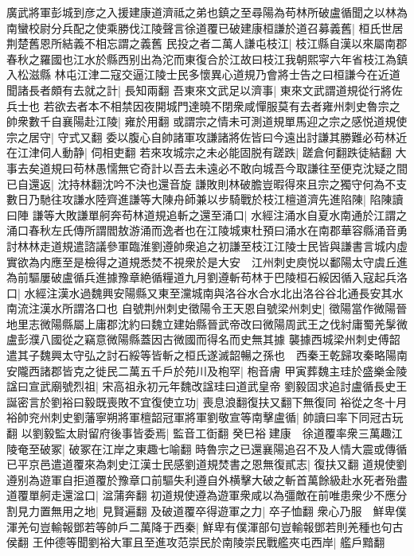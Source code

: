廣武將軍彭城到彦之入援建康道濟祗之弟也鎮之至尋陽為苟林所破盧循聞之以林為南蠻校尉分兵配之使乘勝伐江陵聲言徐道覆已破建康桓謙於道召募義舊|{
	桓氏世居荆楚舊恩所結義不相忘謂之義舊}
民投之者二萬人謙屯枝江|{
	枝江縣自漢以來屬南郡春秋之羅國也江水於縣西别出為沱而東復合於江故曰枝江我朝熙寜六年省枝江為鎮入松滋縣}
林屯江津二寇交逼江陵士民多懷異心道規乃會將士告之曰桓謙今在近道聞諸長者頗有去就之計|{
	長知兩翻}
吾東來文武足以濟事|{
	東來文武謂道規從行將佐兵士也}
若欲去者本不相禁因夜開城門達曉不閉衆咸憚服莫有去者雍州刺史魯宗之帥衆數千自襄陽赴江陵|{
	雍於用翻}
或謂宗之情未可測道規單馬迎之宗之感悦道規使宗之居守|{
	守式又翻}
委以腹心自帥諸軍攻謙諸將佐皆曰今遠出討謙其勝難必苟林近在江津伺人動静|{
	伺相吏翻}
若來攻城宗之未必能固脱有蹉跌|{
	蹉倉何翻跌徒結翻}
大事去矣道規曰苟林愚懦無它奇計以吾去未遠必不敢向城吾今取謙往至便克沈疑之間已自還返|{
	沈持林翻沈吟不決也還音旋}
謙敗則林破膽豈暇得來且宗之獨守何為不支數日乃馳往攻謙水陸齊進謙等大陳舟師兼以步騎戰於枝江檀道濟先進陷陳|{
	陷陳讀曰陣}
謙等大敗謙單舸奔苟林道規追斬之還至涌口|{
	水經注涌水自夏水南通於江謂之涌口春秋左氏傳所謂閻敖游涌而逸者也在江陵城東杜預曰涌水在南郡華容縣涌音勇}
討林林走道規遣諮議參軍臨淮劉遵帥衆追之初謙至枝江江陵士民皆與謙書言城内虛實欲為内應至是檢得之道規悉焚不視衆於是大安　江州刺史庾悦以鄱陽太守虞丘進為前驅屢破盧循兵進據豫章絶循糧道九月劉遵斬苟林于巴陵桓石綏因循入寇起兵洛口|{
	水經注漢水過魏興安陽縣又東至灙城南與洛谷水合水北出洛谷谷北通長安其水南流注漢水所謂洛口也}
自號荆州刺史徵陽令王天恩自號梁州刺史|{
	徵陽當作微陽晉地里志微陽縣屬上庸郡沈約曰魏立建始縣晉武帝改曰微陽周武王之伐紂庸蜀羌髳微盧彭濮八國從之竊意微陽縣蓋因古微國而得名而史無其據}
襲據西城梁州刺史傅韶遣其子魏興太守弘之討石綏等皆斬之桓氏遂滅韶暢之孫也　西秦王乾歸攻秦略陽南安隴西諸郡皆克之徙民二萬五千戶於苑川及枹罕|{
	枹音膚}
甲寅葬魏主珪於盛樂金陵諡曰宣武廟號烈祖|{
	宋高祖永初元年魏改諡珪曰道武皇帝}
劉毅固求追討盧循長史王誕密言於劉裕曰毅既喪敗不宜復使立功|{
	喪息浪翻復扶又翻下無復同}
裕從之冬十月裕帥兖州刺史劉藩寧朔將軍檀韶冠軍將軍劉敬宣等南擊盧循|{
	帥讀曰率下同冠古玩翻}
以劉毅監太尉留府後事皆委焉|{
	監音工衘翻}
癸巳裕建康　徐道覆率衆三萬趣江陵奄至破冢|{
	破冢在江岸之東趣七喻翻}
時魯宗之已還襄陽追召不及人情大震或傳循已平京邑遣道覆來為刺史江漢士民感劉道規焚書之恩無復貳志|{
	復扶又翻}
道規使劉遵别為遊軍自拒道覆於豫章口前驅失利遵自外横擊大破之斬首萬餘級赴水死者殆盡道覆單舸走還湓口|{
	湓蒲奔翻}
初道規使遵為遊軍衆咸以為彊敵在前唯患衆少不應分割見力置無用之地|{
	見賢遍翻}
及破道覆卒得遊軍之力|{
	卒子恤翻}
衆心乃服　鮮卑僕渾羌句豈輸報鄧若等帥戶二萬降于西秦|{
	鮮卑有僕渾部句豈輸報鄧若則羌種也句古侯翻}
王仲德等聞劉裕大軍且至進攻范崇民於南陵崇民戰艦夾屯西岸|{
	艦戶黯翻}

